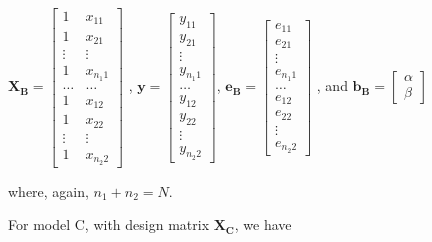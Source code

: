 \documentclass[11pt, oneside]{article}   	%
\begin{document}
\( \mathbf{X_B} =  \left[ \begin{array}{cccc}
1   &  x_{11}     \\
1   &  x_{21}    \\
\vdots &  \vdots   \\
1   &  x_{n_{1}1}  \\
\ldots  & \ldots    \\
1   & x_{12}  \\
1  & x_{22}   \\
\vdots  &  \vdots  \\
1   & x_{n_{2}2}
\end{array} \right] \) ,
\( \mathbf{y} = \left[ \begin{array}{c}
y_{11} \\
y_{21} \\
\vdots  \\
y_{n_{1}1}  \\
\ldots \\
y_{12} \\
y_{22}  \\
\vdots  \\
y_{n_{2}2}
\end{array} \right] \),
\( \mathbf{e_{B}} = \left[ \begin{array}{c}
e_{11} \\
e_{21} \\
\vdots  \\
e_{n_{1}1}  \\
\ldots \\
e_{12} \\
e_{22}  \\
\vdots  \\
e_{n_{2}2}
\end{array} \right] \) ,
\mbox{and}
\( \mathbf{b_{B}} = \left[ \begin{array}{c}
\alpha \\
\beta 
\end{array} \right] \)

\bigskip
\noindent where, again,  $ n_{1} + n_{2} = N $. 
 
 \bigskip

\noindent For model C, with design matrix $ \mathbf{X_{C}} $, we have
\bigskip
\end{document}
